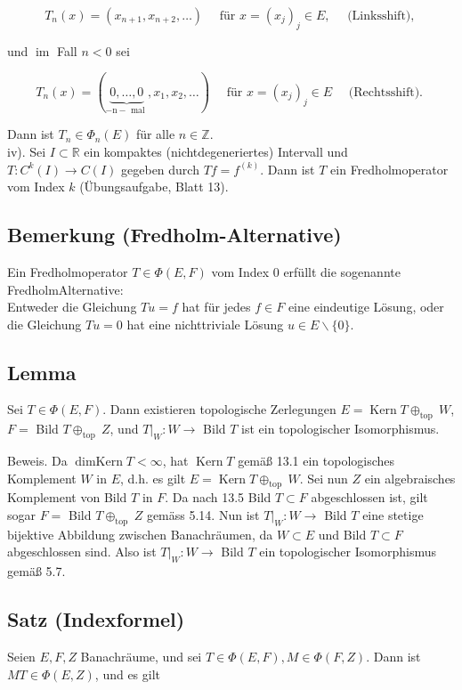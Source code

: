 \documentclass[10pt, letterpaper]{article}
\begin{document}
$$
T_{n}(x)=\left(x_{n+1}, x_{n+2}, \ldots\right) \quad \text { für } x=\left(x_{j}\right)_{j} \in E, \quad \text { (Linksshift), }
$$

und $\operatorname{im}$ Fall $n<0$ sei

$$
T_{n}(x)=(\underbrace{0, \ldots, 0}_{-\mathrm{n}-\text { mal }}, x_{1}, x_{2}, \ldots) \quad \text { für } x=\left(x_{j}\right)_{j} \in E \quad \text { (Rechtsshift). }
$$

Dann ist $T_{n} \in \Phi_{n}(E)$ für alle $n \in \mathbb{Z}$.\\
iv). Sei $I \subset \mathbb{R}$ ein kompaktes (nichtdegeneriertes) Intervall und $T: C^{k}(I) \rightarrow C(I)$ gegeben durch $T f=f^{(k)}$. Dann ist $T$ ein Fredholmoperator vom Index $k$ (Übungsaufgabe, Blatt 13).

\subsection*{Bemerkung (Fredholm-Alternative)}
Ein Fredholmoperator $T \in \Phi(E, F)$ vom Index 0 erfüllt die sogenannte FredholmAlternative:\\
Entweder die Gleichung $T u=f$ hat für jedes $f \in F$ eine eindeutige Lösung, oder die Gleichung $T u=0$ hat eine nichttriviale Lösung $u \in E \backslash\{0\}$.

\subsection*{Lemma}
Sei $T \in \Phi(E, F)$. Dann existieren topologische Zerlegungen $E=\operatorname{Kern} T \oplus_{\text {top }} W$, $F=$ Bild $T \oplus_{\text {top }} Z$, und $\left.T\right|_{W}: W \rightarrow$ Bild $T$ ist ein topologischer Isomorphismus.

Beweis. Da $\operatorname{dimKern} T<\infty$, hat $\operatorname{Kern} T$ gemäß 13.1 ein topologisches Komplement $W$ in $E$, d.h. es gilt $E=\operatorname{Kern} T \oplus_{\text {top }} W$. Sei nun $Z$ ein algebraisches Komplement von Bild $T$ in $F$. Da nach 13.5 Bild $T \subset F$ abgeschlossen ist, gilt sogar $F=$ Bild $T \oplus_{\text {top }} Z$ gemäss 5.14. Nun ist $\left.T\right|_{W}: W \rightarrow$ Bild $T$ eine stetige bijektive Abbildung zwischen Banachräumen, da $W \subset E$ und Bild $T \subset F$ abgeschlossen sind. Also ist $\left.T\right|_{W}: W \rightarrow$ Bild $T$ ein topologischer Isomorphismus gemäß 5.7.

\subsection*{Satz (Indexformel)}
Seien $E, F, Z$ Banachräume, und sei $T \in \Phi(E, F), M \in \Phi(F, Z)$. Dann ist $M T \in \Phi(E, Z)$, und es gilt
\end{document}
